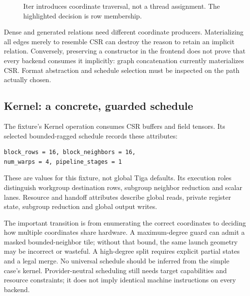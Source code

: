 \begin{figure}[htbp]
\centering
{}
\caption{Iter introduces coordinate traversal, not a thread assignment.
The highlighted decision is row membership.}
\label{fig:iter-design}
\end{figure}

Dense and generated relations need different coordinate producers. Materializing
all edges merely to resemble CSR can destroy the reason to retain an implicit
relation. Conversely, preserving a constructor in the frontend does not prove
that every backend consumes it implicitly: graph concatenation currently
materializes CSR. Format abstraction and schedule selection must be inspected
on the path actually chosen.

\subsection{Kernel: a concrete, guarded schedule}
The fixture's Kernel operation consumes CSR buffers and field tensors. Its
selected bounded-ragged schedule records these attributes:
\begin{lstlisting}[language=TigaIR]
block_rows = 16, block_neighbors = 16,
num_warps = 4, pipeline_stages = 1
\end{lstlisting}
These are values for this fixture, not global Tiga defaults.
Its execution roles distinguish workgroup destination rows, subgroup
neighbor reduction and scalar lanes. Resource and handoff attributes describe
global reads, private register state, subgroup reduction and global output writes.

The important transition is from enumerating the correct coordinates to deciding
how multiple coordinates share hardware. A maximum-degree guard can admit a
masked bounded-neighbor tile; without that bound, the same launch geometry may
be incorrect or wasteful. A high-degree split requires explicit partial states
and a legal merge. No universal schedule should be inferred from the simple
case's kernel. Provider-neutral scheduling still needs target capabilities and
resource constraints; it does not imply identical machine instructions on every
backend.

